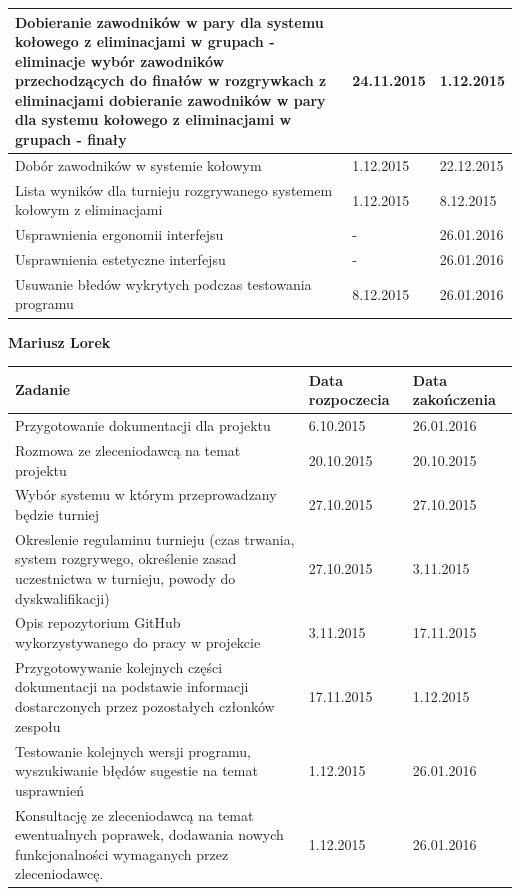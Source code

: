 \begin{tabular}{|p{9cm}|l|p{3cm}|}
Dobieranie zawodników w pary dla systemu kołowego z eliminacjami w grupach - eliminacje
wybór zawodników przechodzących do finałów w rozgrywkach z eliminacjami
dobieranie zawodników w pary dla systemu kołowego z eliminacjami w grupach - finały&24.11.2015&1.12.2015\\ \hline
Dobór zawodników w systemie kołowym&1.12.2015&22.12.2015\\ \hline 
Lista wyników dla turnieju rozgrywanego systemem kołowym z eliminacjami&1.12.2015&8.12.2015\\ \hline
Usprawnienia ergonomii interfejsu& - &26.01.2016\\ \hline
Usprawnienia estetyczne interfejsu& - &26.01.2016\\ \hline
Usuwanie błedów wykrytych podczas testowania programu&8.12.2015&26.01.2016\\ \hline

\end{tabular}
\textbf{Mariusz Lorek}\\
\begin{tabular}{|p{9cm}|l|p{3cm}|} \hline
\textbf{Zadanie} & \textbf{Data rozpoczecia} & \textbf{Data zakończenia}\\ \hline
Przygotowanie dokumentacji dla projektu&6.10.2015&26.01.2016\\ \hline
Rozmowa ze zleceniodawcą na temat projektu &20.10.2015&20.10.2015\\ \hline
Wybór systemu w którym przeprowadzany będzie turniej &27.10.2015&27.10.2015\\ \hline
Okreslenie regulaminu turnieju (czas trwania,  system rozgrywego, określenie zasad uczestnictwa w turnieju, powody do dyskwalifikacji) &27.10.2015&3.11.2015\\ \hline
Opis repozytorium GitHub wykorzystywanego do pracy w projekcie &3.11.2015&17.11.2015\\ \hline
Przygotowywanie kolejnych części dokumentacji na podstawie informacji dostarczonych przez pozostałych członków zespołu&17.11.2015&1.12.2015\\ \hline
Testowanie kolejnych wersji  programu, wyszukiwanie błędów sugestie na temat usprawnień&1.12.2015&26.01.2016\\ \hline
Konsultację ze zleceniodawcą na temat ewentualnych poprawek, dodawania nowych funkcjonalności wymaganych przez zleceniodawcę.&1.12.2015&26.01.2016\\ \hline 
\end{tabular}


